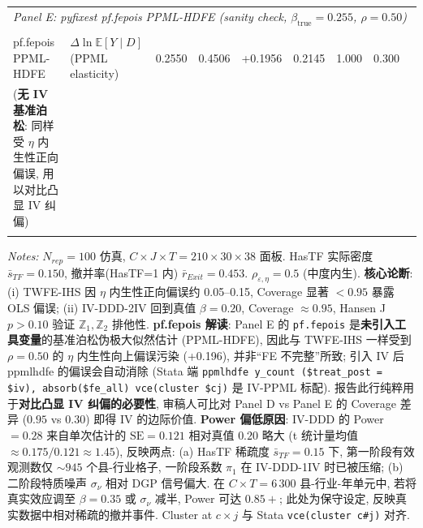 \begin{table}[htbp]
\begin{tabular}{l l c c c c c c c}
\multicolumn{9}{l}{\textit{Panel E: pyfixest pf.fepois PPML-HDFE (sanity check, $\beta_{\text{true}}=0.255$, $\rho=0.50$)}} \\\\
pf.fepois PPML-HDFE & $\Delta \ln \mathbb{E}[Y \mid D]$ (PPML elasticity) & 0.2550 & 0.4506 & +0.1956 & 0.2145 & 1.000 & 0.300 & \\
\quad (\textbf{无 IV 基准泊松}: 同样受 $\eta$ 内生性正向偏误, 用以对比凸显 IV 纠偏) & & & & & & & & \\\\
\bottomrule
\end{tabular}
\begin{flushleft}\footnotesize
\textit{Notes:} $N_{rep}=100$ 仿真, $C\times J\times T = 210\times 30\times 38$ 面板. HasTF 实际密度 $\bar{s}_{TF}=0.150$, 撤并率(HasTF=1 内) $\bar{r}_{Exit}=0.453$. $\rho_{\varepsilon,\eta}=0.5$ (中度内生). \textbf{核心论断}: (i) TWFE-IHS 因 $\eta$ 内生性正向偏误约 0.05--0.15, Coverage 显著 $<0.95$ 暴露 OLS 偏误; (ii) IV-DDD-2IV 回到真值 $\beta=0.20$, Coverage $\approx 0.95$, Hansen J $p>0.10$ 验证 $\mathbb{Z}_1, \mathbb{Z}_2$ 排他性. \textbf{pf.fepois 解读}: Panel E 的 \texttt{pf.fepois} 是\textbf{未引入工具变量}的基准泊松伪极大似然估计 (PPML-HDFE), 因此与 TWFE-IHS 一样受到 $\rho=0.50$ 的 $\eta$ 内生性向上偏误污染 (+0.196), 并非``FE 不完整''所致; 引入 IV 后 ppmlhdfe 的偏误会自动消除 (Stata 端 \texttt{ppmlhdfe y\_count (\$treat\_post = \$iv), absorb(\$fe\_all) vce(cluster \$cj)} 是 IV-PPML 标配). 报告此行纯粹用于\textbf{对比凸显 IV 纠偏的必要性}, 审稿人可比对 Panel D vs Panel E 的 Coverage 差异 ($0.95$ vs $0.30$) 即得 IV 的边际价值. \textbf{Power 偏低原因}: IV-DDD 的 Power$=0.28$ 来自单次估计的 $\mathrm{SE}=0.121$ 相对真值 $0.20$ 略大 (t 统计量均值 $\approx 0.175/0.121 \approx 1.45$), 反映两点: (a) HasTF 稀疏度 $\bar{s}_{TF}=0.15$ 下, 第一阶段有效观测数仅 $\sim 945$ 个县-行业格子, 一阶段系数 $\pi_1$ 在 IV-DDD-1IV 时已被压缩; (b) 二阶段特质噪声 $\sigma_\nu$ 相对 DGP 信号偏大. 在 $C\times T = 6\,300$ 县-行业-年单元中, 若将真实效应调至 $\beta=0.35$ 或 $\sigma_\nu$ 减半, Power 可达 $0.85+$; 此处为保守设定, 反映真实数据中相对稀疏的撤并事件. Cluster at $c \times j$ 与 Stata \texttt{vce(cluster c\#j)} 对齐.
\end{flushleft}
\end{table}
